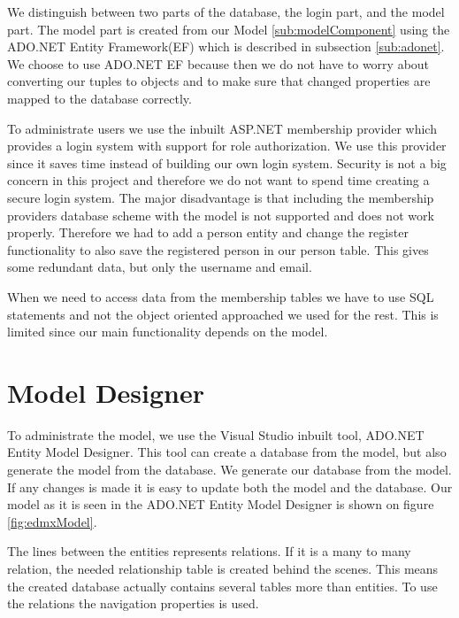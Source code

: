 \label{sec:databasestructure}

We distinguish between two parts of the database, the login part, and the model part. 
The model part is created from our Model \ref{sub:modelComponent} using the ADO.NET Entity Framework(EF) which is described in subsection \ref{sub:adonet}. 
We choose to use ADO.NET EF because then we do not have to worry about converting our tuples to objects and to make sure that changed properties are mapped to the database correctly.  

To administrate users we use the inbuilt ASP.NET membership provider which provides a login system with support for role authorization. 
We use this provider since it saves time instead of building our own login system. 
Security is not a big concern in this project and therefore we do not want to spend time creating a secure login system. 
The major disadvantage is that including the membership providers database scheme with the model is not supported and does not work properly. 
Therefore we had to add a person entity and change the register functionality to also save the registered person in our person table. 
This gives some redundant data, but only the username and email. 

When we need to access data from the membership tables we have to use SQL statements and not the object oriented approached we used for the rest. 
This is limited since our main functionality depends on the model. 

\section{Model Designer}
To administrate the model, we use the Visual Studio inbuilt tool, ADO.NET Entity Model Designer. This tool can create a database from the model, but also generate the model from the database. We generate our database from the model. If any changes is made it is easy to update both the model and the database. 
Our model as it is seen in the ADO.NET Entity Model Designer is shown on figure \ref{fig:edmxModel}.

The lines between the entities represents relations. If it is a many to many relation, the needed relationship table is created behind the scenes. This means the created database actually contains several tables more than entities. To use the relations the navigation properties is used. \vspace{2mm}

